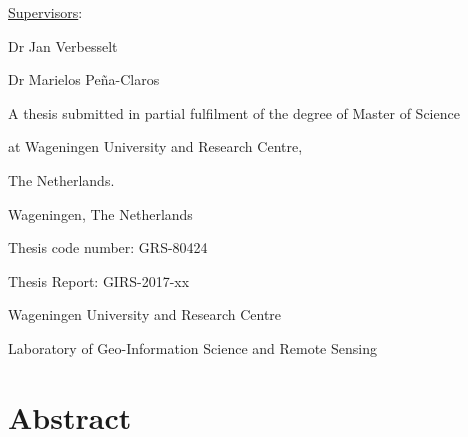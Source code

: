 \documentclass[a4paper,12pt]{scrbook}
\begin{document}
\begin{titlingpage}
\begin{center}
  {\large \underline{Supervisors}:}\vspace{1.1cm}
  
  {Dr Jan Verbesselt}
  
  {Dr Marielos Peña-Claros}\vspace{3.0cm}
  
  {A thesis submitted in partial fulfilment of the degree of Master of Science}
  
  {at Wageningen University and Research Centre,}
  
  {The Netherlands.}\vspace{2.7cm}
  \end{center}
  
  \begin{flushright}
    {\thedate}
  
    {Wageningen, The Netherlands}
  \end{flushright}\vspace{0.5cm}

    Thesis code number: GRS-80424
  
    Thesis Report: GIRS-2017-xx
  
    {Wageningen University and Research Centre}
  
    {Laboratory of Geo-Information Science and Remote Sensing}
 \end{titlingpage}

\chapter*{Abstract}
\end{document}
